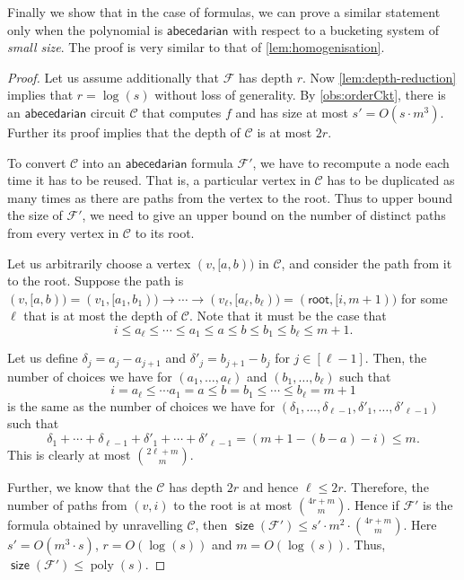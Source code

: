 \documentclass[10pt,a4paper]{article}
\def\poly{\operatorname{poly}}
\newcommand{\ckt}{\textbf{$\mathcal{C}$}}
\newcommand{\form}{\textbf{$\mathcal{F}$}}
\newcommand{\size}{\operatorname{\mathsf{size}}}
\newcommand{\rt}{\mathsf{root}}
\newcommand{\abcd}{\mathsf{abecedarian}}
\begin{document}
Finally we show that in the case of formulas, we can prove a similar statement only when the polynomial is $\abcd$ with respect to a bucketing system of \emph{small size}.
The proof is very similar to that of \autoref{lem:homogenisation}.

\orderForm*

\begin{proof}
	Let us assume additionally that $\form$ has depth $r$. 
	Now \autoref{lem:depth-reduction} implies that $r = \log(s)$ without loss of generality.
	By \autoref{obs:orderCkt}, there is an $\abcd$ circuit $\ckt$ that computes $f$ and has size at most $s' = O(s \cdot m^3)$. 
	Further its proof implies that the depth of $\ckt$ is at most $2r$.
	
	To convert $\ckt$ into an $\abcd$ formula $\form'$, we have to recompute a node each time it has to be reused. 
	That is, a particular vertex in $\ckt$ has to be duplicated as many times as there are paths from the vertex to the root. 
	Thus to upper bound the size of $\form'$, we need to give an upper bound on the number of distinct paths from every vertex in $\ckt$ to its root.
	
	Let us arbitrarily choose a vertex $(v,[a,b))$ in $\ckt$, and consider the path from it to the root.
	Suppose the path is $(v,[a,b)) = (v_1, [a_1, b_1)) \rightarrow \cdots \rightarrow (v_\ell, [a_\ell, b_\ell)) = (\rt, [i, m+1))$ for some $\ell$ that is at most the depth of $\ckt$. 
	Note that it must be the case that 
	\[
		i \leq a_\ell \leq \cdots \leq a_1 \leq a \leq b \leq b_1 \leq b_\ell \leq m+1.
	\]

	Let us define $\delta_j = a_{j} - a_{j+1}$ and $\delta'_{j} = b_{j+1} - b_{j}$ for $j \in [\ell - 1]$. 
	Then, the number of choices we have for $(a_1, \ldots, a_\ell)$ and $(b_1, \ldots, b_\ell)$ such that 
	\[
		i = a_\ell \leq \cdots a_1 = a \leq b = b_1 \leq \cdots \leq b_\ell = m+1
	\]
	is the same as the number of choices we have for $(\delta_1, \ldots, \delta_{\ell-1}, \delta'_1, \ldots, \delta'_{\ell - 1})$ such that 
	\[
		\delta_1 + \cdots + \delta_{\ell - 1} + \delta'_1 + \cdots + \delta'_{\ell - 1} = (m+1 - (b-a) - i) \leq m.	
	\] 
	This is clearly at most ${2\ell + m}\choose{m}$.
	
	Further, we know that the $\ckt$ has depth $2r$ and hence $\ell \leq 2r$. 
	Therefore, the number of paths from $(v, i)$ to the root is at most $4r + m \choose m$. 
	Hence if $\form'$ is the formula obtained by unravelling $\ckt$, then $\size(\form') \leq s' \cdot m^2 \cdot {4r + m \choose m}$.	
	Here $s'  = O(m^3 \cdot s)$, $r = O(\log(s))$ and $m = O(\log(s))$.
	Thus, $\size(\form') \leq \poly(s)$.
\end{proof}
\end{document}
